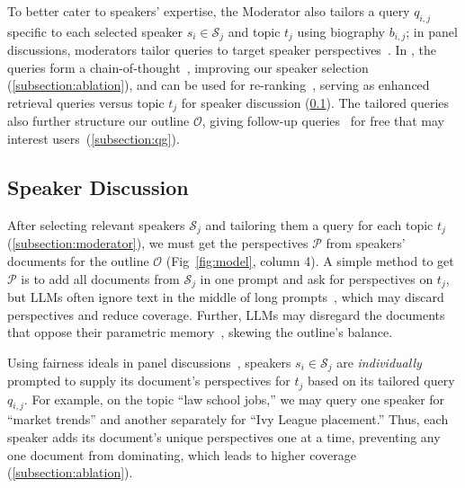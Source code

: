To better cater to speakers' expertise, the Moderator also tailors a query $q_{i, j}$ specific to each selected speaker $s_i \in \mathcal{S}_j$ and topic $t_j$ using biography $b_{i,j}$; in panel discussions, moderators tailor queries to target speaker perspectives~\cite{Fingerhut2002, panel_discussion_questions}.
In \model, the queries form a chain-of-thought~\cite{10.5555/3600270.3602070}, improving our speaker selection (\cref{subsection:ablation}), and can be used for re-ranking~\cite{sachan2022improving}, serving as enhanced retrieval queries versus topic $t_j$ for speaker discussion (\cref{subsection:speaker}).
The tailored queries also further structure our outline $\mathcal{O}$, giving follow-up queries~\cite{liu2019fanda} for free that may interest users~(\cref{subsection:qg}).

\subsection{Speaker Discussion} \label{subsection:speaker}

After selecting relevant speakers $\mathcal{S}_j$ and tailoring them a query for each topic $t_j$ (\cref{subsection:moderator}), we must get the perspectives $\mathcal{P}$ from speakers' documents for the outline $\mathcal{O}$ (Fig~\ref{fig:model}, column 4).
A simple method to get $\mathcal{P}$ is to add all documents from $\mathcal{S}_j$ in one prompt and ask for perspectives on $t_j$, but LLMs often ignore text in the middle of long prompts~\cite{liu2024lost}, which may discard perspectives and reduce coverage. Further, LLMs may disregard the documents that oppose their parametric memory~\cite{jin2024tug}, skewing the outline's balance.

Using fairness ideals in panel discussions~\cite{Fingerhut2002}, speakers $s_i \in \mathcal{S}_j$ are \textit{individually} prompted to supply its document's perspectives for $t_j$ based on its tailored query $q_{i,j}$.
For example, on the topic ``law school jobs,'' we may query one speaker for ``market trends'' and another separately for ``Ivy League placement.''
Thus, each speaker adds its document's unique perspectives one at a time, preventing any one document from dominating, which leads to higher coverage (\cref{subsection:ablation}).



